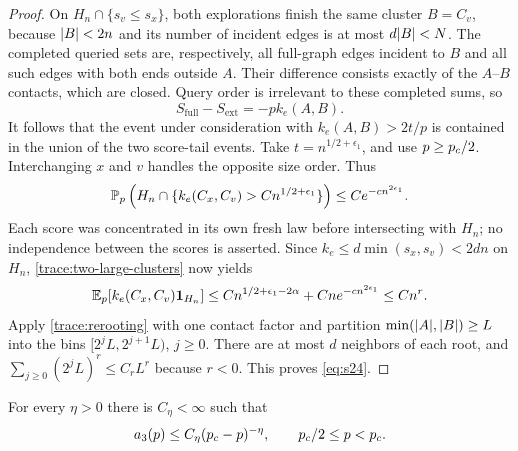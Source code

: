 \begin{proof}
On $H_n\cap\{s_v\le s_x\}$, both explorations finish the same
cluster $B=C_v$, because $\lvert B\rvert<2n$ and its number of incident
edges is at most $d\lvert B\rvert<N$.  The completed queried sets are,
respectively, all full-graph edges incident to $B$ and all such
edges with both ends outside $A$.  Their difference consists
exactly of the $A$--$B$ contacts, which are closed.  Query order is
irrelevant to these completed sums, so
\[
 S_{\mathrm{full}}-S_{\mathrm{ext}}=-p k_e(A,B).
\]
It follows that the event under consideration with
$k_e(A,B)>2t/p$ is contained in the union of the two score-tail
events.  Take $t=n^{1/2+\epsilon_1}$, and use $p\ge{p_c}/2$.
Interchanging $x$ and $v$ handles the opposite size order.  Thus
\[
 \mathbb P_p\left(H_n\cap
             \{k_e(C_x,C_v)>C n^{1/2+\epsilon_1}\}\right)
             \le C e^{-c n^{2\epsilon_1}}.
\]
Each score was concentrated in its own fresh law before
intersecting with $H_n$; no independence between the scores is
asserted.  Since $k_e\le d\min(s_x,s_v)<2dn$ on $H_n$,
\eqref{trace:two-large-clusters} now yields
\[
 \mathbb E_p[k_e(C_x,C_v)\mathbf 1_{H_n}]
 \le C n^{1/2+\epsilon_1-2\alpha}
                      +C n e^{-c n^{2\epsilon_1}}
 \le C n^r.
\]
Apply \eqref{trace:rerooting} with one contact factor and partition
$\min(\lvert A\rvert,\lvert B\rvert)\ge L$ into the bins
$[2^jL,2^{j+1}L)$, $j\ge0$.  There are at most $d$ neighbors of
each root, and $\sum_{j\ge0}(2^jL)^r\le C_rL^r$ because $r<0$.
This proves \eqref{eq:s24}.
\end{proof}

\begin{proposition}
\label{trace:subpower}
For every $\eta>0$ there is $C_\eta<\infty$ such that
\begin{equation}
 a_3(p)\le C_\eta({p_c}-p)^{-\eta},
 \qquad {p_c}/2\le p<{p_c}.
 \label{eq:s23}
\end{equation}
\end{proposition}

